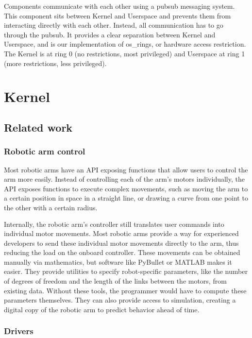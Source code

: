 Components communicate with each other using a \gls{pubsub} messaging system. This component sits between Kernel and Userspace and prevents them from interacting directly with each other. Instead, all communication has to go through the \gls{pubsub}. It provides a clear separation between Kernel and Userspace, and is our implementation of \glspl{os_ring}, or hardware access restriction. The Kernel is at ring 0 (no restrictions, most privileged) and Userspace at ring 1 (more restrictions, less privileged).




\section{Kernel}


\subsection{Related work}

\subsubsection{Robotic arm control}

Most robotic arms have an API exposing functions that allow users to control the arm more easily. Instead of controlling each of the arm's motors individually, the API exposes functions to execute complex movements, such as moving the arm to a certain position in space in a straight line, or drawing a curve from one point to the other with a certain radius.

Internally, the robotic arm's controller still translates user commands into individual motor movements. Most robotic arms provide a way for experienced developers to send these individual motor movements directly to the arm, thus reducing the load on the onboard controller. These movements can be obtained manually via mathematics, but software like PyBullet\cite{pybullet} or MATLAB\cite{MATLAB} makes it easier. They provide utilities to specify robot-specific parameters, like the number of degrees of freedom and the length of the links between the motors, from existing data. Without these tools, the programmer would have to compute these parameters themselves. They can also provide access to simulation, creating a digital copy of the robotic arm to predict behavior ahead of time.

\subsubsection{Drivers}

